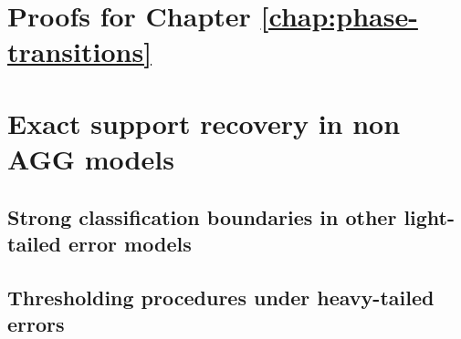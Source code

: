 \chapter{Proofs for Chapter \ref{chap:phase-transitions}}
\label{sec:supplement:proofs}


\chapter{Exact support recovery in non AGG models}

\section{Strong classification boundaries in other light-tailed error models}
\label{suppsec:other-boundaries}



\section{Thresholding procedures under heavy-tailed errors}
\label{suppsec:heavy-tailed}

